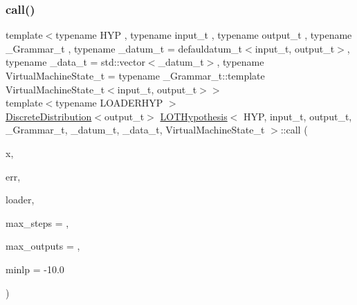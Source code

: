 \subsubsection{\texorpdfstring{call()}{call()}\hspace{0.1cm}{\footnotesize\ttfamily [1/2]}}
{\footnotesize\ttfamily template$<$typename H\+YP , typename input\+\_\+t , typename output\+\_\+t , typename \+\_\+\+Grammar\+\_\+t , typename \+\_\+datum\+\_\+t  = defauldatum\+\_\+t$<$input\+\_\+t, output\+\_\+t$>$, typename \+\_\+data\+\_\+t  = std\+::vector$<$\+\_\+datum\+\_\+t$>$, typename Virtual\+Machine\+State\+\_\+t  = typename \+\_\+\+Grammar\+\_\+t\+::template Virtual\+Machine\+State\+\_\+t$<$input\+\_\+t, output\+\_\+t$>$$>$ \\
template$<$typename L\+O\+A\+D\+E\+R\+H\+YP $>$ \\
\hyperlink{class_discrete_distribution}{Discrete\+Distribution}$<$output\+\_\+t$>$ \hyperlink{class_l_o_t_hypothesis}{L\+O\+T\+Hypothesis}$<$ H\+YP, input\+\_\+t, output\+\_\+t, \+\_\+\+Grammar\+\_\+t, \+\_\+datum\+\_\+t, \+\_\+data\+\_\+t, Virtual\+Machine\+State\+\_\+t $>$\+::call (\begin{DoxyParamCaption}\item[{const input\+\_\+t}]{x,  }\item[{const output\+\_\+t}]{err,  }\item[{L\+O\+A\+D\+E\+R\+H\+YP $\ast$}]{loader,  }\item[{unsigned long}]{max\+\_\+steps = {},  }\item[{unsigned long}]{max\+\_\+outputs = {},  }\item[{double}]{minlp = {\ttfamily -\/10.0} }\end{DoxyParamCaption})\hspace{0.3cm}{\ttfamily [inline]}}

\mbox{\label{class_l_o_t_hypothesis_a3e46160113b9602cff4c4765c768b57d}} 
